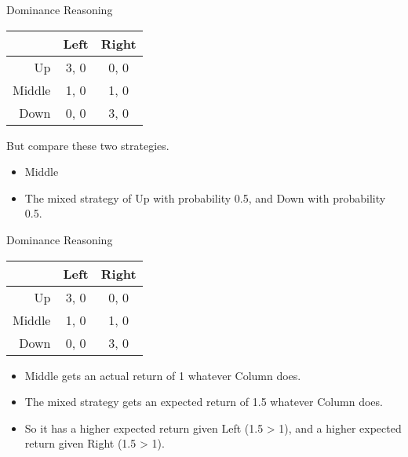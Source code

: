 \documentclass[
  ignorenonframetext,
]{beamer}
\providecommand{\tightlist}{%
  \setlength{\itemsep}{0pt}\setlength{\parskip}{0pt}}
\begin{document}
\begin{frame}{Dominance Reasoning}
\protect\hypertarget{dominance-reasoning-1}{}
\begin{table}[!h]
\centering
\begin{tabular}[t]{>{}r|cc}
\toprule
 & Left & Right\\
\midrule
Up & 3, 0 & 0, 0\\
Middle & 1, 0 & 1, 0\\
Down & 0, 0 & 3, 0\\
\bottomrule
\end{tabular}
\end{table}

But compare these two strategies.

\begin{itemize}
\tightlist
\item
  Middle
\item
  The mixed strategy of Up with probability 0.5, and Down with
  probability 0.5.
\end{itemize}
\end{frame}

\begin{frame}{Dominance Reasoning}
\protect\hypertarget{dominance-reasoning-2}{}
\begin{table}[!h]
\centering
\begin{tabular}[t]{>{}r|cc}
\toprule
 & Left & Right\\
\midrule
Up & 3, 0 & 0, 0\\
Middle & 1, 0 & 1, 0\\
Down & 0, 0 & 3, 0\\
\bottomrule
\end{tabular}
\end{table}

\begin{itemize}
\tightlist
\item
  Middle gets an actual return of 1 whatever Column does.
\item
  The mixed strategy gets an expected return of 1.5 whatever Column
  does.
\item
  So it has a higher expected return given Left (1.5 \textgreater{} 1),
  and a higher expected return given Right (1.5 \textgreater{} 1).
\end{itemize}
\end{frame}
\end{document}
